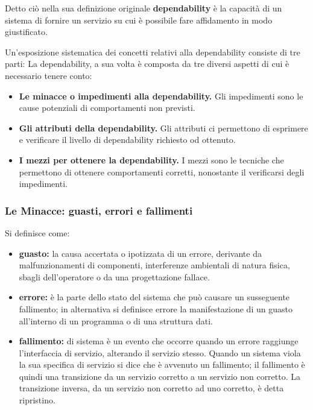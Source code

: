 \documentclass[14pt]{extarticle}
\begin{document}
Detto ciò nella sua definizione originale \textbf{dependability} è
la capacità di un sistema di fornire un servizio su cui è possibile fare affidamento in
modo giustificato.\cite{bondavalli2011analisi}

Un'esposizione sistematica dei concetti relativi alla dependability consiste di tre parti:
La dependability, a sua volta è  composta da tre diversi aspetti di cui è necessario tenere conto:
\begin{itemize}
\item \textbf{Le minacce o impedimenti alla dependability.} Gli impedimenti sono le
cause potenziali di comportamenti non previsti.
\item \textbf{Gli attributi della dependability.} Gli attributi ci permettono di esprimere
e verificare il livello di dependability richiesto od ottenuto.
\item \textbf{I mezzi per ottenere la dependability.} I mezzi sono le tecniche che
permettono di ottenere comportamenti corretti, nonostante il verificarsi
degli impedimenti.
\end{itemize}

\subsubsection{Le Minacce: guasti, errori e fallimenti}
Si definisce come:\cite{bondavalli2011analisi}
\begin{itemize}
\item \textbf{guasto:} la causa accertata o ipotizzata di un errore, derivante da malfunzionamenti di componenti, interferenze ambientali di natura fisica, sbagli dell'operatore o da una progettazione fallace.
\item \textbf{errore:} è la parte dello stato del sistema che può causare un susseguente fallimento; in alternativa si definisce errore la manifestazione di un guasto all'interno di un programma o di una struttura dati.
\item \textbf{fallimento:} di sistema è un evento che occorre quando un errore raggiunge l'interfaccia di servizio, alterando il servizio stesso. Quando un sistema viola la sua specifica di servizio si dice che è avvenuto un fallimento; il fallimento è quindi una transizione da un servizio corretto a un servizio non corretto. La transizione inversa, da un servizio non corretto ad uno corretto, è detta ripristino.
\end{itemize}
\end{document}
